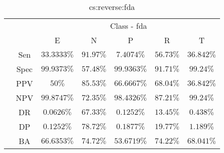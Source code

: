 \begin{table}[!ht]
	\centering
	\begin{tabular}{|c|c|c|c|c|c|c|}
		\cline{3-7}
		\multicolumn{2}{c|}{} & \multicolumn{5}{c|}{Class - fda} \\ \cline{3-7}
		\multicolumn{2}{c|}{} & E & N & P & R & T \\ \hline
		\multirow{7}{*}{\rotatebox{90}{Statistics}} & Sen & $33.3333\%$ & $91.97\%$ & $7.4074\%$ & $56.73\%$ & $36.842\%$ \\ \cline{2-7}
		 & Spec & $99.9373\%$ & $57.48\%$ & $99.9363\%$ & $91.71\%$ & $99.24\%$ \\ \cline{2-7}
		 & PPV & $50\%$ & $85.53\%$ & $66.6667\%$ & $68.04\%$ & $36.842\%$ \\ \cline{2-7}
		 & NPV & $99.8747\%$ & $72.35\%$ & $98.4326\%$ & $87.21\%$ & $99.24\%$ \\ \cline{2-7}
		 & DR & $0.0626\%$ & $67.33\%$ & $0.1252\%$ & $13.45\%$ & $0.438\%$ \\ \cline{2-7}
		 & DP & $0.1252\%$ & $78.72\%$ & $0.1877\%$ & $19.77\%$ & $1.189\%$ \\ \cline{2-7}
		 & BA & $66.6353\%$ & $74.72\%$ & $53.6719\%$ & $74.22\%$ & $68.041\%$ \\ \hline
	\end{tabular}
	\caption{cs:reverse:fda}
	\label{tab:cs:reverse:fda}
\end{table}
